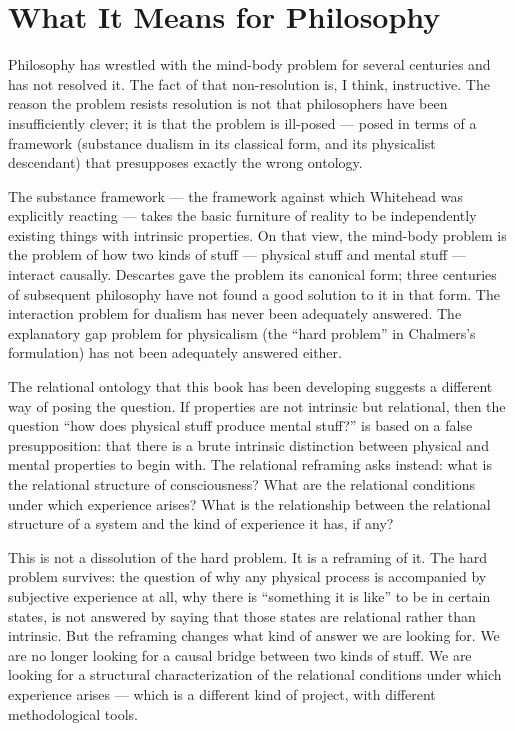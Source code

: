 \section{What It Means for Philosophy}
\label{sec:ch15-philosophy}

Philosophy has wrestled with the mind-body problem for several centuries and
has not resolved it.  The fact of that non-resolution is, I think, instructive.
The reason the problem resists resolution is not that philosophers have been
insufficiently clever; it is that the problem is ill-posed --- posed in terms
of a framework (substance dualism in its classical form, and its physicalist
descendant) that presupposes exactly the wrong ontology.

The substance framework --- the framework against which Whitehead was explicitly
reacting --- takes the basic furniture of reality to be independently existing
things with intrinsic properties.  On that view, the mind-body problem is the
problem of how two kinds of stuff --- physical stuff and mental stuff --- interact
causally.  Descartes gave the problem its canonical form; three centuries of
subsequent philosophy have not found a good solution to it in that form.  The
interaction problem for dualism has never been
adequately answered.  The explanatory gap problem for physicalism (the ``hard
problem'' in Chalmers's formulation) has not been adequately answered either.

The relational ontology that this book has been developing suggests a different
way of posing the question.  If properties are not intrinsic but relational,
then the question ``how does physical stuff produce mental stuff?'' is based on
a false presupposition: that there is a brute intrinsic distinction between
physical and mental properties to begin with.  The relational reframing asks
instead: what is the relational structure of consciousness?  What are the
relational conditions under which experience arises?  What is the relationship
between the relational structure of a system and the kind of experience it has,
if any?

This is not a dissolution of the hard problem.  It is a reframing of it.  The
hard problem survives: the question of why any physical process is accompanied
by subjective experience at all, why there is ``something it is like'' to be
in certain states, is not answered by saying that those states are relational
rather than intrinsic.  But the reframing changes what kind of answer we are
looking for.  We are no longer looking for a causal bridge between two kinds of
stuff.  We are looking for a structural characterization of the relational
conditions under which experience arises --- which is a different kind of
project, with different methodological tools.

